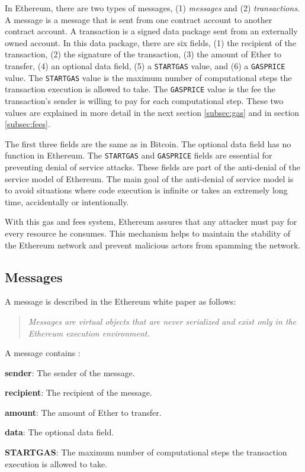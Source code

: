 In Ethereum, there are two types of messages, (1) \textit{messages} and (2) \textit{transactions}. A message is a message that is sent from one contract
account to another contract account. A transaction is a signed data package sent from an externally owned account. In this data package, there are
six fields, (1) the recipient of the transaction, (2) the signature of the transaction, (3) the amount of Ether to transfer,
(4) an optional data field, (5) a \texttt{STARTGAS} value, and (6) a \texttt{GASPRICE} value. The \texttt{STARTGAS} value is the maximum number of computational
steps the transaction execution is allowed to take. The \texttt{GASPRICE} value is the fee the transaction's sender is willing to pay for each computational
step. These two values are explained in more detail in the next section \ref{subsec:gas} and in section \ref{subsec:fees}.


The first three fields are the same as in Bitcoin. The optional data field has no function in Ethereum. The \texttt{STARTGAS} and \texttt{GASPRICE} fields are
essential for preventing denial of service attacks. These fields are part of the anti-denial of the service model of Ethereum. The main goal of
the anti-denial of service model is to avoid situations where code execution is infinite or takes an extremely long time, accidentally
or intentionally.


With this gas and fees system, Ethereum assures that any attacker must pay for every resource he consumes. This mechanism helps
to maintain the stability of the Ethereum network and prevent malicious actors from spamming the network.



\subsection{Messages}

A message is described in the Ethereum white paper \cite{ethereum_white_paper} as follows:


\begin{quote}
   \textit{Messages are virtual objects that are never serialized and exist only in the Ethereum execution environment.}
\end{quote}


A message contains :


\begin{list}{-}{}
   \item \textbf{sender}: The sender of the message.
   \item \textbf{recipient}: The recipient of the message.
   \item \textbf{amount}: The amount of Ether to transfer.
   \item \textbf{data}: The optional data field.
   \item \textbf{STARTGAS}: The maximum number of computational steps the transaction execution is allowed to take.
\end{list}


